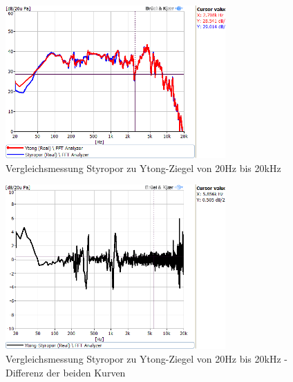 \begin{figure} [H]
	\centering
	\includegraphics[width=0.75\textwidth]{img/Optimierung/Vergleich/VergleichYtognStyro_full.png}
	\caption{Vergleichsmessung Styropor zu Ytong-Ziegel von 20Hz bis 20kHz}
	\label{fig:4.4.1.1}
\end{figure}
\begin{figure} [H]
	\centering
	\includegraphics[width=0.75\textwidth]{img/Optimierung/Vergleich/VergleichYtognStyro_Abweichung_full.png}
	\caption{Vergleichsmessung Styropor zu Ytong-Ziegel von 20Hz bis 20kHz - Differenz der beiden Kurven}
	\label{fig:4.4.1.2}
\end{figure}


